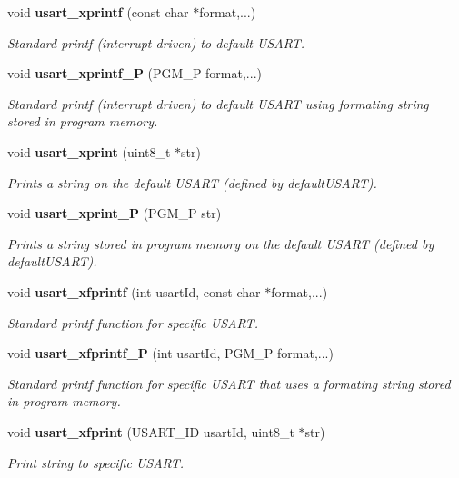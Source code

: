 \begin{DoxyCompactItemize}
void {\bf usart\+\_\+xprintf} (const char $\ast$format,...)
\begin{DoxyCompactList}\small\item\em Standard printf (interrupt driven) to default U\+S\+A\+R\+T. \end{DoxyCompactList}\item 
void {\bf usart\+\_\+xprintf\+\_\+\+P} (P\+G\+M\+\_\+\+P format,...)
\begin{DoxyCompactList}\small\item\em Standard printf (interrupt driven) to default U\+S\+A\+R\+T using formating string stored in program memory. \end{DoxyCompactList}\item 
void {\bf usart\+\_\+xprint} (uint8\+\_\+t $\ast$str)
\begin{DoxyCompactList}\small\item\em Prints a string on the default U\+S\+A\+R\+T (defined by default\+U\+S\+A\+R\+T). \end{DoxyCompactList}\item 
void {\bf usart\+\_\+xprint\+\_\+\+P} (P\+G\+M\+\_\+\+P str)
\begin{DoxyCompactList}\small\item\em Prints a string stored in program memory on the default U\+S\+A\+R\+T (defined by default\+U\+S\+A\+R\+T). \end{DoxyCompactList}\item 
void {\bf usart\+\_\+xfprintf} (int usart\+Id, const char $\ast$format,...)
\begin{DoxyCompactList}\small\item\em Standard printf function for specific U\+S\+A\+R\+T. \end{DoxyCompactList}\item 
void {\bf usart\+\_\+xfprintf\+\_\+\+P} (int usart\+Id, P\+G\+M\+\_\+\+P format,...)
\begin{DoxyCompactList}\small\item\em Standard printf function for specific U\+S\+A\+R\+T that uses a formating string stored in program memory. \end{DoxyCompactList}\item 
void {\bf usart\+\_\+xfprint} (U\+S\+A\+R\+T\+\_\+\+I\+D usart\+Id, uint8\+\_\+t $\ast$str)
\begin{DoxyCompactList}\small\item\em Print string to specific U\+S\+A\+R\+T. \end{DoxyCompactList}\item 

\end{DoxyCompactItemize}
